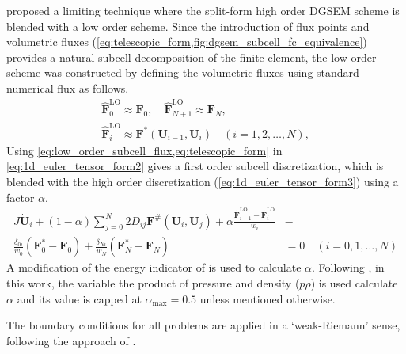 \documentclass[a4paper,11pt,oneside]{article}
\newcommand{\citear}[1]{\citeauthor{#1} \cite{#1}} %
\newcommand{\vect}[1]{\ensuremath{\boldsymbol{\mathbf{#1}}}} %
\newcommand{\textlo}{\text{LO}} %
\newcommand{\textmax}{\text{max}} %
\newcommand{\eulerref}[1]{\ensuremath{#1}} %
\begin{document}
\citear{hennemannRamirezHindenlang2021} proposed a limiting technique where the split-form high order DGSEM scheme is blended with a low order scheme. Since the introduction of flux points and volumetric fluxes (\cref{eq:telescopic_form,fig:dgsem_subcell_fc_equivalence}) provides a natural subcell decomposition of the finite element, the low order scheme was constructed by defining the volumetric fluxes using standard numerical flux as follows.
\begin{equation}
	\begin{gathered}
		\hat{\vect{\eulerref{F}}}^\textlo_0 \approx \vect{\eulerref{F}}_0, \quad \hat{\vect{\eulerref{F}}}^\textlo_{N+1} \approx \vect{\eulerref{F}}_N,\\
		\hat{\vect{\eulerref{F}}}^\textlo_i \approx \vect{\eulerref{F}}^*(\vect{\eulerref{U}}_{i-1}, \vect{\eulerref{U}}_i)\quad (i=1,2,\ldots,N),
	\end{gathered}
	\label{eq:low_order_subcell_flux}
\end{equation}
Using \cref{eq:low_order_subcell_flux,eq:telescopic_form} in \cref{eq:1d_euler_tensor_form2} gives a first order subcell discretization, which is blended with the high order discretization (\cref{eq:1d_euler_tensor_form3}) using a factor $\alpha$.
\begin{equation}
	\begin{aligned}
		J \dot{\vect{\eulerref{U}}}_i + (1-\alpha) \sum_{j=0}^{N} 2 D_{ij} \vect{\eulerref{F}}^\#(\vect{\eulerref{U}}_i, \vect{\eulerref{U}}_j) + \alpha \frac{\hat{\vect{\eulerref{F}}}^\textlo_{i+1} - \hat{\vect{\eulerref{F}}}^\textlo_i}{w_i} &-\\
		\frac{\delta_{0i}}{w_0} \left( \vect{\eulerref{F}}^*_0 - \vect{\eulerref{F}}_0 \right) + \frac{\delta_{Ni}}{w_N} \left( \vect{\eulerref{F}}^*_N - \vect{\eulerref{F}}_N \right) &= 0 \quad (i=0,1,\ldots,N)
	\end{aligned}
	\label{eq:1d_euler_tensor_form4}
\end{equation}
A modification of the energy indicator of \citear{perssonPeraire2006} is used to calculate $\alpha$. Following \cite{hennemannRamirezHindenlang2021}, in this work, the variable the product of pressure and density ($p\rho$) is used calculate $\alpha$ and its value is capped at $\alpha_\textmax=0.5$ unless mentioned otherwise.

The boundary conditions for all problems are applied in a `weak-Riemann' sense, following the approach of \citear{mengaldoDeGraziaPeiro2014}.
\end{document}
